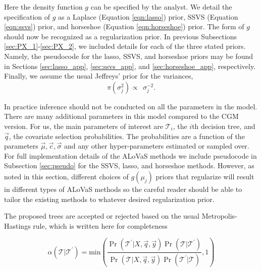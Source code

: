 Here the density function $g$ can be specified by the analyst. We detail the specification of $g$ as a Laplace (Equation \ref{eqn:lasso}) prior, SSVS (Equation \ref{eqn:ssvs}) prior, and horseshoe (Equation \ref{eqn:horseshoe}) prior. The form of $g$ should now be recognized as a regularization prior. In previous Subsections \ref{sec:PX_1}-\ref{sec:PX_2}, we included details for each of the three stated priors. Namely, the pseudocode for the lasso, SSVS, and horseshoe priors may be found in Sections \ref{sec:lasso_app}, \ref{sec:ssvs_app}, and \ref{sec:horseshoe_app}, respectively.
Finally, we assume the usual Jeffreys' prior for the variances, 
\begin{equation}
\pi(\sigma^2_j) \propto \ \  \sigma^{-2}_j. 
\end{equation}

In practice inference should not be conducted on all the parameters in the model. There are many additional parameters in this model compared to the CGM version. For us, the main parameters of interest are $\mathcal{T}_i$, the $i$th decision tree, and $\vec{q}$, the covariate selection probabilities. The probabilities are a function of the parameters $\vec{\mu},\vec{c},\vec{\sigma}$ and any other hyper-parameters estimated or sampled over. For full implementation details of the ALoVaS methods we include pseudocode in Subsection \ref{sec:pseudo} for the SSVS, lasso, and horseshoe methods. However, as noted in this section, different choices of $g(\mu_j)$ priors that regularize will result in different types of ALoVaS methods so the careful reader should be able to tailor the existing methods to whatever desired regularization prior. 

 The proposed trees are accepted or rejected based on the usual Metropolis-Hastings rule, which is written here for completeness
 
 \begin{equation}
\alpha(\mathcal{T}\vert \mathcal{T}^\prime) = \text{min}\left(\frac{\Pr(\mathcal{T}^\prime \vert X, \vec{q}, \vec{y} )\Pr(\mathcal{T}| \mathcal{T}^\prime) }{ \Pr(\mathcal{T} \vert X, \vec{q}, \vec{y})\Pr(\mathcal{T}^\prime \vert \mathcal{T}) } ,1\right)
 \end{equation}
 
